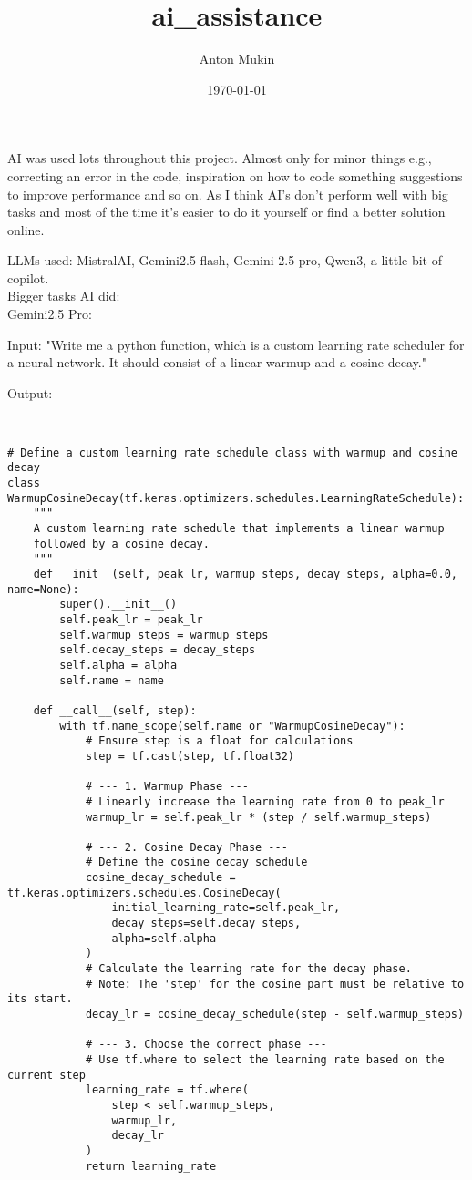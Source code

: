 \documentclass{article}
\title{ai_assistance}
\author{Anton Mukin}
\date{\today}
\begin{document}
AI was used lots throughout this project. Almost only for minor things 
e.g., correcting an error in the code, inspiration on how to code something 
suggestions to improve performance and so on.
As I think AI's don't perform well with big tasks and most of the time it's 
easier to do it yourself or find a better solution online.

LLMs used: MistralAI, Gemini2.5 flash, Gemini 2.5 pro, Qwen3, a little bit 
of copilot.
\\[2em]

Bigger tasks AI did: 
\\[2em]

Gemini2.5 Pro:

Input: "Write me a python function, which is a custom learning rate 
scheduler for a neural network. It should consist of a linear warmup and a 
cosine decay."

Output:
\begin{verbatim}
    

# Define a custom learning rate schedule class with warmup and cosine decay
class WarmupCosineDecay(tf.keras.optimizers.schedules.LearningRateSchedule):
    """
    A custom learning rate schedule that implements a linear warmup
    followed by a cosine decay.
    """
    def __init__(self, peak_lr, warmup_steps, decay_steps, alpha=0.0, name=None):
        super().__init__()
        self.peak_lr = peak_lr
        self.warmup_steps = warmup_steps
        self.decay_steps = decay_steps
        self.alpha = alpha
        self.name = name

    def __call__(self, step):
        with tf.name_scope(self.name or "WarmupCosineDecay"):
            # Ensure step is a float for calculations
            step = tf.cast(step, tf.float32)
            
            # --- 1. Warmup Phase ---
            # Linearly increase the learning rate from 0 to peak_lr
            warmup_lr = self.peak_lr * (step / self.warmup_steps)

            # --- 2. Cosine Decay Phase ---
            # Define the cosine decay schedule
            cosine_decay_schedule = tf.keras.optimizers.schedules.CosineDecay(
                initial_learning_rate=self.peak_lr,
                decay_steps=self.decay_steps,
                alpha=self.alpha
            )
            # Calculate the learning rate for the decay phase.
            # Note: The 'step' for the cosine part must be relative to its start.
            decay_lr = cosine_decay_schedule(step - self.warmup_steps)

            # --- 3. Choose the correct phase ---
            # Use tf.where to select the learning rate based on the current step
            learning_rate = tf.where(
                step < self.warmup_steps,
                warmup_lr,
                decay_lr
            )
            return learning_rate
\end{verbatim}
\end{document}
